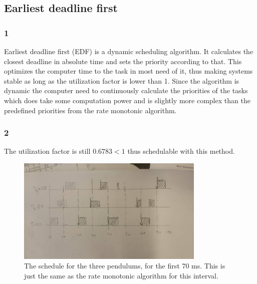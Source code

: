 \documentclass[10pt,a4paper]{article}
\begin{document}
\subsection*{Earliest deadline first}
\subsubsection*{1}
Earliest deadline first (EDF) is a dynamic scheduling algorithm. It calculates the closest deadline in absolute time and sets the priority according to that. This optimizes the computer time to the task in most need of it, thus making systems stable as long as the utilization factor is lower than 1. Since the algorithm is dynamic the computer need to continuously calculate the priorities of the tasks which does take some computation power and is slightly more complex than the predefined priorities from the rate monotonic algorithm.
\subsubsection*{2}  
The utilization factor is still $0.6783<1$ thus schedulable with this method.
\begin{figure}[!h]
  \centering
    \includegraphics[width=0.8\textwidth]{egen.jpg}
      \caption{The schedule for the three pendulums, for the first 70 ms. This is just the same as the rate monotonic algorithm for this interval.}
\end{figure}
\newpage
\end{document}
